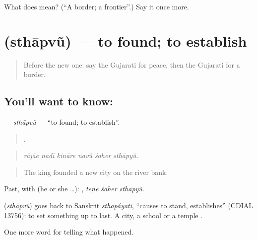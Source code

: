 \begin{tcolorbox}[breakable,colback=teal!4,colframe=teal!35!black,title={Before you move on}]
What does  mean? (\textquotedblleft{}A border; a frontier\textquotedblright{}.) Say it once more.
\end{tcolorbox}
\section[\texorpdfstring{\gu{સ્થાપવું} (sthāpvũ)}{સ્થાપવું (sthāpvũ)}]{ (sthāpvũ) — to found; to establish}

\label{lesson:GU-C326-sthapvu}



\begin{quote}
Before the new one: say the Gujarati for peace, then the Gujarati for a border.
\end{quote}

\subsection*{You'll want to know: }
\textbf{} — \emph{sthāpvũ} — \textquotedblleft{}to found; to establish\textquotedblright{}.

\begin{quote}
     .
\end{quote}

\begin{quote}
\emph{rājāe nadī kināre navũ śaher sthāpyũ.}
\end{quote}

\begin{quote}
The king founded a new city on the river bank.
\end{quote}

Past, with  (he or she …):   , \emph{teṇe śaher sthāpyũ}.

\begin{cousinweb}
\textbf{} (\emph{sthāpvũ}) goes back to Sanskrit \emph{sthāpáyati}, \textquotedblleft{}causes to stand, establishes\textquotedblright{} (CDIAL 13756): to set something up to last. A city, a school or a temple \textbf{ }.
\end{cousinweb}

\begin{grammarlens}[title={What you've built}]
One more word for telling what happened.
\end{grammarlens}

